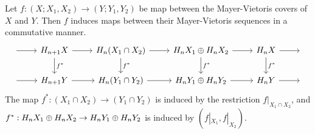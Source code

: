 \begin{prop} Let $f:(X;X_1,X_2)\rightarrow (Y;Y_1,Y_2)$ be map between the Mayer-Vietoris covers of $X$ and $Y$. Then $f$ induces maps between their Mayer-Vietoris sequences in a commutative manner.
\[\begin{tikzcd}
{} \arrow[r] & H_{n+1}X \arrow[d, "f^*"] \arrow[r] & H_n(X_1\cap X_2) \arrow[d, "f^*"] \arrow[r] & H_nX_1\dsum H_nX_2 \arrow[d, "f^*"] \arrow[r] & H_nX \arrow[d, "f^*"] \arrow[r] & {} \\
{} \arrow[r] & H_{n+1}Y \arrow[r]                  & H_n(Y_1\cap Y_2) \arrow[r]                  & H_nY_1\dsum H_nY_2 \arrow[r]                  & H_nY \arrow[r]                  & {}
\end{tikzcd}\]
The map $f^*:(X_1\cap X_2)\rightarrow (Y_1\cap Y_2)$ is induced by the restriction $f|_{X_1\cap X_2}$, and $f^*:H_n X_1\oplus H_n X_2 \rightarrow H_n Y_1\oplus H_n Y_2$ is induced by $(f|_{X_1},f|_{X_2})$.
\end{prop}


